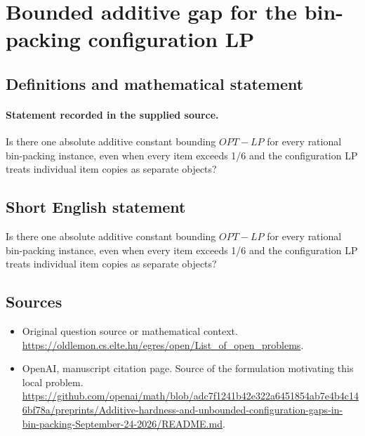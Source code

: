 \documentclass[11pt]{article}
\begin{document}
\section*{Bounded additive gap for the bin-packing configuration LP}\label{statement}
\subsection{Definitions and mathematical statement}
\paragraph{Statement recorded in the supplied source.}
Is there one absolute additive constant bounding $OPT-LP$ for every rational bin-packing instance, even when every item exceeds 1/6 and the configuration LP treats individual item copies as separate objects?
\subsection{Short English statement}
Is there one absolute additive constant bounding $OPT-LP$ for every rational bin-packing instance, even when every item exceeds 1/6 and the configuration LP treats individual item copies as separate objects?
\subsection{Sources}
\begin{itemize}
\item[S1] Original question source or mathematical context.
\url{https://oldlemon.cs.elte.hu/egres/open/List_of_open_problems}.
\item[S2] OpenAI, manuscript citation page. Source of the formulation motivating this local problem.
\url{https://github.com/openai/math/blob/adc7f1241b42e322a6451854ab7e4b4c146bf78a/preprints/Additive-hardness-and-unbounded-configuration-gaps-in-bin-packing-September-24-2026/README.md}.
\end{itemize}
\end{document}
